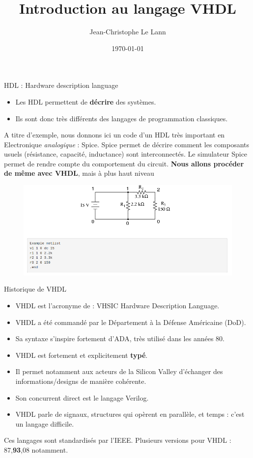 \documentclass[xcolor=table]{beamer} %
\title[Automates]{Introduction au langage VHDL}
\author{Jean-Christophe Le Lann}
\institute{ENSTA Bretagne}
\date{\today}
\begin{document}
\begin{frame}
\titlepage
\end{frame}

\begin{frame}{HDL : Hardware description language}
  \begin{itemize}
    \item Les HDL permettent de \textbf{décrire} des systèmes.
    \item Ils sont donc très différents des langages de programmation classiques.
  \end{itemize}

  A titre d'exemple, nous donnons ici un code d'un HDL très important en Electronique {\it analogique} : Spice.
  Spice permet de décrire comment les composants usuels (résistance, capacité, inductance) sont interconnectés.
  Le simulateur Spice permet de rendre compte du comportement du circuit.
  \textbf{Nous allons procéder de même avec VHDL}, mais à plus haut niveau
  \begin{figure}[h!]
    \centering
    \includegraphics[scale=0.30]{./figures/spice.png}
  \end{figure}
\end{frame}

\begin{frame}{Historique de VHDL}
  \begin{itemize}
    \item VHDL est l'acronyme de : VHSIC Hardware Description Language.
    \item VHDL a été commandé par le Département à la Défense Américaine (DoD).
    \item Sa syntaxe s'inspire fortement d'ADA, très utilisé dans les années 80.
    \item VHDL est fortement et explicitement \textbf{typé}.
    \item Il permet notamment aux acteurs de la Silicon Valley d'échanger des informations/designs de manière cohérente.
    \item Son concurrent direct est le langage Verilog.
    \item VHDL parle de signaux, structures qui opèrent en parallèle, et temps : c'est un langage difficile.
  \end{itemize}

  Ces langages sont standardisés par l'IEEE. Plusieurs versions pour VHDL : 87,\textbf{93},08 notamment.
\end{frame}
\end{document}
